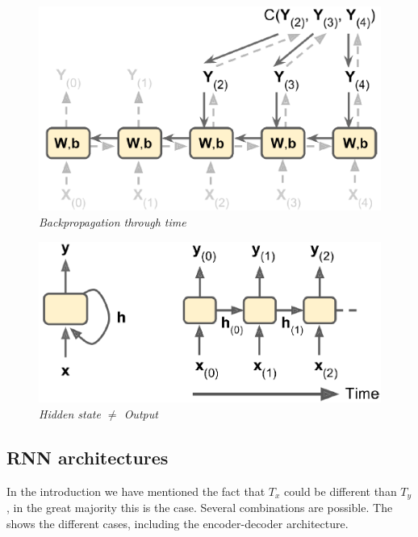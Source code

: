 \begin{multicols}{2}
    \begin{figure}[H]
        \centering
        \label{fig:BPTT}
        \includegraphics[scale=0.35]{img/BPTT.png}
        \caption{\textit{Backpropagation through time}}
    \end{figure}
    \newcolumn
    \begin{figure}[H]
        \centering
        \label{fig:rnn_hidden}
        \includegraphics[scale=0.4]{img/rnn_hidden.png}
        \caption{\textit{Hidden state $\ne$ Output}}
    \end{figure}
\end{multicols}

\subsection{RNN architectures}
In the introduction we have mentioned the fact that $T_x$ could be different than $T_y$, in the great majority this is the case. Several combinations are possible. The  shows the different cases, including the encoder-decoder architecture.
\vspace{-0.2cm}
